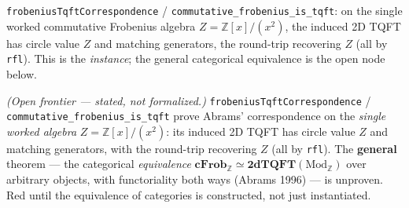 \begin{theorem}\label{thm:frobenius-tqft-instance}\leanok{}
\texttt{frobeniusTqftCorrespondence} / \texttt{commutative\_frobenius\_is\_tqft}: on the single worked commutative Frobenius algebra $Z=\mathbb{Z}[x]/(x^2)$, the induced 2D TQFT has circle value $Z$ and matching generators, the round-trip recovering $Z$ (all by \texttt{rfl}). This is the \emph{instance}; the general categorical equivalence is the open node below.
\end{theorem}
\begin{theorem}\label{thm:abrams-equivalence-general}\notready{}
\emph{(Open frontier --- stated, not formalized.)} \texttt{frobeniusTqftCorrespondence} / \texttt{commutative\_frobenius\_is\_tqft} prove Abrams' correspondence on the \emph{single worked algebra} $Z = \mathbb{Z}[x]/(x^2)$: its induced 2D TQFT has circle value $Z$ and matching generators, with the round-trip recovering $Z$ (all by \texttt{rfl}). The \textbf{general} theorem --- the categorical \emph{equivalence} $\mathbf{cFrob}_\mathbb{Z} \simeq \mathbf{2dTQFT}(\mathrm{Mod}_\mathbb{Z})$ over arbitrary objects, with functoriality both ways (Abrams 1996) --- is unproven. Red until the equivalence of categories is constructed, not just instantiated.
\end{theorem}

